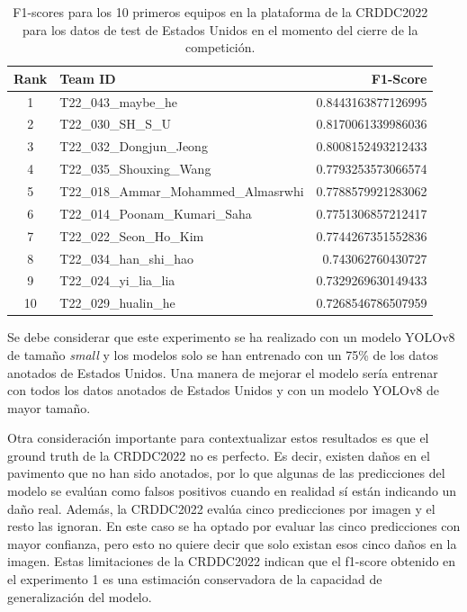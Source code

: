 \begin{table}[H]
    \centering
    \begin{tabular}{|c|l|r|}
    \hline
    \textbf{Rank} & \textbf{Team ID} & \textbf{F1-Score} \\ \hline
    1  & T22\_043\_maybe\_he                  & 0.8443163877126995 \\ \hline
    2  & T22\_030\_SH\_S\_U                   & 0.8170061339986036 \\ \hline
    3  & T22\_032\_Dongjun\_Jeong             & 0.8008152493212433 \\ \hline
    4  & T22\_035\_Shouxing\_Wang             & 0.7793253573066574 \\ \hline
    5  & T22\_018\_Ammar\_Mohammed\_Almasrwhi & 0.7788579921283062 \\ \hline
    6  & T22\_014\_Poonam\_Kumari\_Saha       & 0.7751306857212417 \\ \hline
    7  & T22\_022\_Seon\_Ho\_Kim              & 0.7744267351552836 \\ \hline
    8  & T22\_034\_han\_shi\_hao              & 0.743062760430727  \\ \hline
    9  & T22\_024\_yi\_lia\_lia               & 0.7329269630149433 \\ \hline
    10 & T22\_029\_hualin\_he                 & 0.7268546786507959 \\ \hline
    \end{tabular}
    \caption{F1-scores para los 10 primeros equipos en la plataforma de la CRDDC2022 para los datos de test de Estados Unidos en el momento del cierre de la competición.}
    \label{tab:top10_f1_scores}
\end{table}

Se debe considerar que este experimento se ha realizado con un modelo YOLOv8 de tamaño \textit{small} y los modelos solo se han entrenado con un 75\% de los datos anotados de Estados Unidos. Una manera de mejorar el modelo sería entrenar con todos los datos anotados de Estados Unidos y con un modelo YOLOv8 de mayor tamaño.

Otra consideración importante para contextualizar estos resultados es que el ground truth de la CRDDC2022 no es perfecto. Es decir, existen daños en el pavimento que no han sido anotados, por lo que algunas de las predicciones del modelo se evalúan como falsos positivos cuando en realidad sí están indicando un daño real. Además, la CRDDC2022 evalúa cinco predicciones por imagen y el resto las ignoran. En este caso se ha optado por evaluar las cinco predicciones con mayor confianza, pero esto no quiere decir que solo existan esos cinco daños en la imagen. Estas limitaciones de la CRDDC2022 indican que el f1-score obtenido en el experimento 1 es una estimación conservadora de la capacidad de generalización del modelo.

